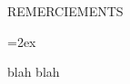 
   \parskip=0pt
   \vspace*{0.1 truecm} 
   \begin{center}
    {\uppercase { REMERCIEMENTS }}\par
   \end{center}
   \nobreak \vspace*{1.10 truecm}
   \parskip=2ex



blah blah


